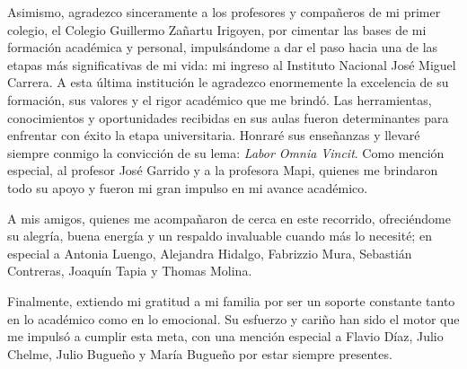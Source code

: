 \begin{small}
    Asimismo, agradezco sinceramente a los profesores y compañeros de mi primer colegio, el Colegio Guillermo Zañartu Irigoyen, por cimentar las bases de mi formación académica y personal, impulsándome a dar el paso hacia una de las etapas más significativas de mi vida: mi ingreso al Instituto Nacional José Miguel Carrera. A esta última institución le agradezco enormemente la excelencia de su formación, sus valores y el rigor académico que me brindó. Las herramientas, conocimientos y oportunidades recibidas en sus aulas fueron determinantes para enfrentar con éxito la etapa universitaria. Honraré sus enseñanzas y llevaré siempre conmigo la convicción de su lema: \textit{Labor Omnia Vincit}. Como mención especial, al profesor José Garrido y a la profesora Mapi, quienes me brindaron todo su apoyo y fueron mi gran impulso en mi avance académico.

    A mis amigos, quienes me acompañaron de cerca en este recorrido, ofreciéndome su alegría, buena energía y un respaldo invaluable cuando más lo necesité; en especial a Antonia Luengo, Alejandra Hidalgo, Fabrizzio Mura, Sebastián Contreras, Joaquín Tapia y Thomas Molina.

    Finalmente, extiendo mi gratitud a mi familia por ser un soporte constante tanto en lo académico como en lo emocional. Su esfuerzo y cariño han sido el motor que me impulsó a cumplir esta meta, con una mención especial a Flavio Díaz, Julio Chelme, Julio Bugueño y María Bugueño por estar siempre presentes.

\end{small}
\addtocounter{page}{-1}